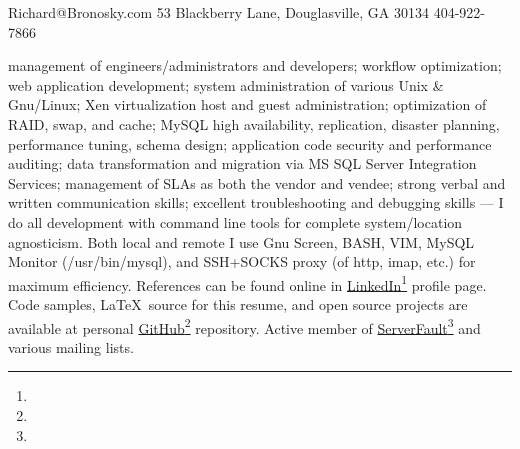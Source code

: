 \documentclass[10pt]{article}
\begin{document}
{Richard@Bronosky.com}
{53 Blackberry Lane, Douglasville, GA 30134}
{404-922-7866}

\begin{longtext}
    management of engineers/administrators and developers;
    workflow optimization;
    web application development;
    system administration of various Unix \& Gnu/Linux;
    Xen virtualization host and guest administration;
    optimization of RAID, swap, and cache;
    MySQL high availability, replication, disaster planning, performance tuning, schema design;
    application code security and performance auditing;
    data transformation and migration via MS SQL Server Integration Services;
    management of SLAs as both the vendor and vendee;
    strong verbal and written communication skills;
    excellent troubleshooting and debugging skills
    \halfskip
    --- I do all development with command line tools for complete system/location
        agnosticism. Both local and remote I use Gnu Screen, BASH, VIM, MySQL Monitor
        (/usr/bin/mysql), and SSH+SOCKS proxy (of http, imap, etc.) for maximum efficiency.
        References can be found online in \href{http://www.linkedin.com/in/richardbronosky}{LinkedIn}\footnote{} profile page.
        Code samples, \LaTeX\ source for this resume, and open source projects are available at personal \href{http://github.com/RichardBronosky/}{GitHub}\footnote{} repository.
        Active member of \href{http://serverfault.com/users/4131/richard-bronosky#answers}{ServerFault}\footnote{} and various mailing lists.
        \shortspace
\end{longtext}



\end{document}
